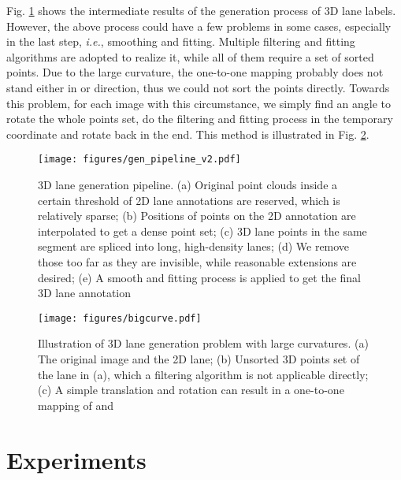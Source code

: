\documentclass[runningheads]{llncs}
\begin{document}
Fig. \ref{fig:sup-dataset gen pipeline} shows the intermediate results of the generation process of 3D lane labels.
However, the above process could have a few problems in some cases, especially in the last step, \textit{i.e.}, smoothing and fitting.
Multiple filtering and fitting algorithms are adopted to realize it, while all of them require a set of sorted points.
Due to the large curvature, the one-to-one mapping probably does not stand either in  or  direction, thus we could not sort the points directly. Towards this problem, for each image with this circumstance, we simply find an angle to rotate the whole points set, do the filtering and fitting process in the temporary coordinate and rotate back in the end. This method is illustrated in Fig. \ref{fig:sup-dataset large curvature}.

\begin{figure}[tb!]
    \centering
    \texttt{[image: figures/gen\_pipeline\_v2.pdf]}
    \caption{3D lane generation pipeline. (a) Original point clouds inside a certain threshold of 2D lane annotations are reserved, which is relatively sparse; (b) Positions of points on the 2D annotation are interpolated to get a dense point set; (c) 3D lane points in the same segment are spliced into long, high-density lanes; (d) We remove those too far as they are invisible, while reasonable extensions are desired; (e) A smooth and fitting process is applied to get the final 3D lane annotation}
    \label{fig:sup-dataset gen pipeline}
\end{figure}
\begin{figure}[tb!]
    \centering
    \texttt{[image: figures/bigcurve.pdf]}
    \caption{Illustration of 3D lane generation problem with large curvatures. (a) The original image and the 2D lane; (b) Unsorted 3D points set of the lane in (a), which a filtering algorithm is not applicable directly; (c) A simple translation and rotation can result in a one-to-one mapping of  and }
    \label{fig:sup-dataset large curvature}
\end{figure}








\section{Experiments}\label{sec: sup - exp}
\end{document}
